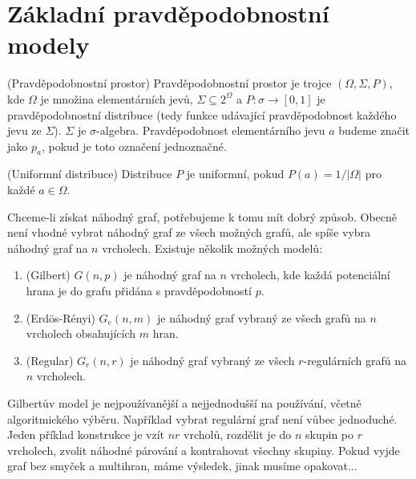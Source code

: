 \section{Základní pravděpodobnostní modely}
\df (Pravděpodobnostní prostor) Pravděpodobnostní prostor je trojce $(\Omega,
\Sigma, P)$, kde $\Omega$ je množina elementárních jevů, $\Sigma \subseteq
2^\Omega$ a $P: \sigma \to [ 0, 1 ]$ je pravděpodobnostní distribuce (tedy
funkce udávající pravděpodobnost každého jevu ze $\Sigma$).  $\Sigma$ je
$\sigma$-algebra. Pravděpodobnost elementárního jevu $a$ budeme značit jako
$p_a$, pokud je toto označení jednoznačné.


\df (Uniformní distribuce) Distribuce $P$ je uniformní, pokud $P(a) = 1 /
|\Omega|$ pro každé $a \in \Omega$.

Chceme-li získat náhodný graf, potřebujeme k tomu mít dobrý způsob. Obecně není
vhodné vybrat náhodný graf ze všech možných grafů, ale spíše vybra náhodný graf
na $n$ vrcholech. Existuje několik možných modelů:
\begin{enumerate}
	\item (Gilbert) $G(n,p)$ je náhodný graf na $n$ vrcholech, kde každá
		potenciální hrana je do grafu přidána s pravděpodobností $p$.
	\item (Erdös-Rényi) $G_e(n,m)$ je náhodný graf vybraný ze všech grafů na $n$
		vrcholech obsahujících $m$ hran.
	\item (Regular) $G_r(n,r)$ je náhodný graf vybraný ze všech $r$-regulárních
		grafů na $n$ vrcholech.
\end{enumerate}
Gilbertův model je nejpoužívanější a nejjednodušší na používání, včetně
algoritmického výběru. Například vybrat regulární graf není vůbec jednoduché.
Jeden příklad konstrukce je vzít $nr$ vrcholů, rozdělit je do $n$ skupin po $r$
vrcholech, zvolit náhodné párování a kontrahovat všechny skupiny. Pokud vyjde
graf bez smyček a multihran, máme výsledek, jinak musíme opakovat...


